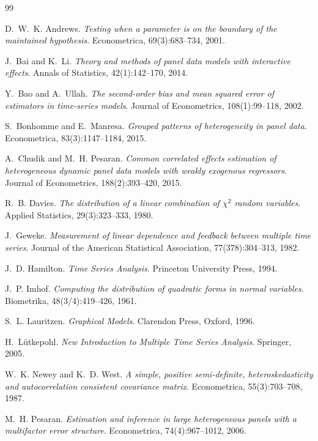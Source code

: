 \documentclass[11pt,letterpaper]{article}
\theoremstyle{remark}
\begin{document}
\begin{thebibliography}{99}

 D.~W.~K. Andrews. \emph{Testing when a parameter is on the boundary of the maintained hypothesis}. Econometrica, 69(3):683--734, 2001.

 J.~Bai and K.~Li. \emph{Theory and methods of panel data models with interactive effects}. Annals of Statistics, 42(1):142--170, 2014.

 Y.~Bao and A.~Ullah. \emph{The second-order bias and mean squared error of estimators in time-series models}. Journal of Econometrics, 108(1):99--118, 2002.

 S.~Bonhomme and E.~Manresa. \emph{Grouped patterns of heterogeneity in panel data}. Econometrica, 83(3):1147--1184, 2015.

 A.~Chudik and M.~H. Pesaran. \emph{Common correlated effects estimation of heterogeneous dynamic panel data models with weakly exogenous regressors}. Journal of Econometrics, 188(2):393--420, 2015.

 R.~B. Davies. \emph{The distribution of a linear combination of $\chi^2$ random variables}. Applied Statistics, 29(3):323--333, 1980.

 J.~Geweke. \emph{Measurement of linear dependence and feedback between multiple time series}. Journal of the American Statistical Association, 77(378):304--313, 1982.

 J.~D. Hamilton. \emph{Time Series Analysis}. Princeton University Press, 1994.

 J.~P. Imhof. \emph{Computing the distribution of quadratic forms in normal variables}. Biometrika, 48(3/4):419--426, 1961.

 S.~L. Lauritzen. \emph{Graphical Models}. Clarendon Press, Oxford, 1996.

 H.~L\"utkepohl. \emph{New Introduction to Multiple Time Series Analysis}. Springer, 2005.

 W.~K. Newey and K.~D. West. \emph{A simple, positive semi-definite, heteroskedasticity and autocorrelation consistent covariance matrix}. Econometrica, 55(3):703--708, 1987.

 M.~H. Pesaran. \emph{Estimation and inference in large heterogeneous panels with a multifactor error structure}. Econometrica, 74(4):967--1012, 2006.


\end{thebibliography}
\end{document}
